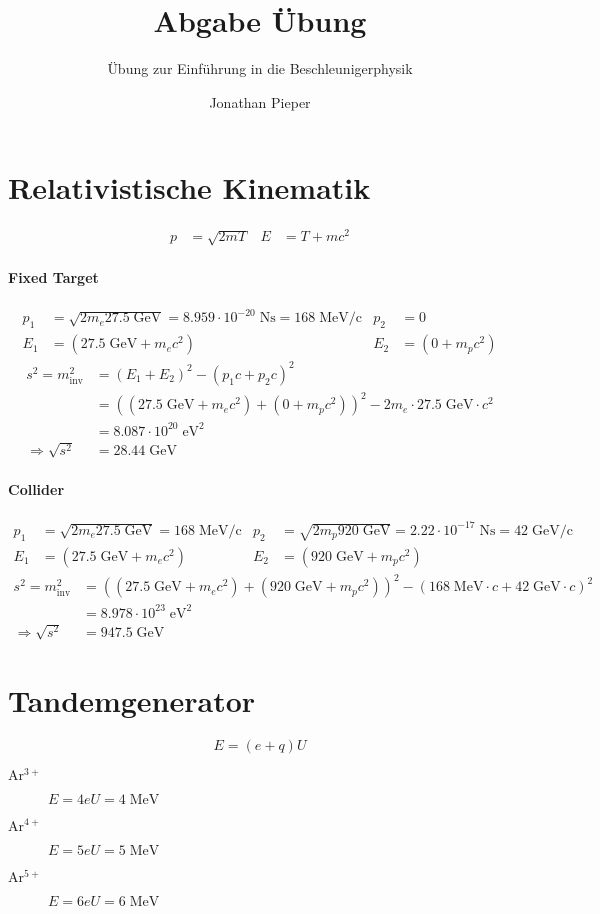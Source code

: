 \documentclass[12pt,DIV=15,a4paper,twoside,draft=false]{scrartcl}
\author{Jonathan Pieper}
\title{Abgabe Übung \blatt{}}
\subtitle{Übung zur Einführung in die Beschleunigerphysik}
\newcommand{\blatt}{2}
\begin{document}
\maketitle
\titlelabel{Aufgabe \blatt{}.\thesection{} }

\section{Relativistische Kinematik}
\begin{align*}
p &= \sqrt{2mT} &
E &= T + mc^2
\end{align*}
\paragraph{Fixed Target}
\begin{align*}
p_1 &= \sqrt{2 m_e 27.5\;\mathrm{GeV}} = 
8.959\cdot 10^{-20}\;\mathrm{Ns} = 168\;\mathrm{MeV/c} & 
p_2 &= 0\\
E_1 &= (27.5\;\mathrm{GeV} + m_e c^2) & 
E_2 &= (0 + m_p c^2)
\end{align*}
\begin{align*}
s^2 = m_{\mathrm{inv}}^2 &=
 (E_1 + E_2)^2 - (p_1c + p_2c)^2\\
  &=  ((27.5\;\mathrm{GeV} + m_e c^2) + (0+ m_p c^2))^2 - 2 m_e \cdot 27.5\;\mathrm{GeV} \cdot c^2\\
&= 8.087\cdot 10^{20}\;\mathrm{eV}^2 \\
⇒ \sqrt{s^2} &= 28.44\;\mathrm{GeV}
\end{align*}
\paragraph{Collider}
\begin{align*}
p_1 &= \sqrt{2 m_e 27.5\;\mathrm{GeV}} = 168\;\mathrm{MeV/c}& 
p_2 &= \sqrt{2 m_p 920\;\mathrm{GeV}} = 2.22\cdot 10^{-17}\;\mathrm{Ns} = 42\;\mathrm{GeV/c}\\
E_1 &= (27.5\;\mathrm{GeV} + m_e c^2) & 
E_2 &= (920\;\mathrm{GeV} + m_p c^2)
\end{align*}
\begin{align*}
s^2 = m_{\mathrm{inv}}^2 &=
 ((27.5\;\mathrm{GeV} + m_e c^2) + (920\;\mathrm{GeV} + m_p c^2))^2 - 
(168\;\mathrm{MeV}\cdot c + 42\;\mathrm{GeV}\cdot c)^2\\
&= 8.978\cdot 10^{23}\;\mathrm{eV}^2\\
⇒ \sqrt{s^2} &= 947.5 \;\mathrm{GeV}
\end{align*}

\section{Tandemgenerator}
$$ E = (e+q) U $$
\begin{description}
\item[$\mathrm{Ar^{3+}}$] $ E = 4 e U = 4 \;\mathrm{MeV}$
\item[$\mathrm{Ar^{4+}}$] $ E = 5 e U = 5 \;\mathrm{MeV}$
\item[$\mathrm{Ar^{5+}}$] $ E = 6 e U = 6 \;\mathrm{MeV}$
\end{description}
\end{document}
